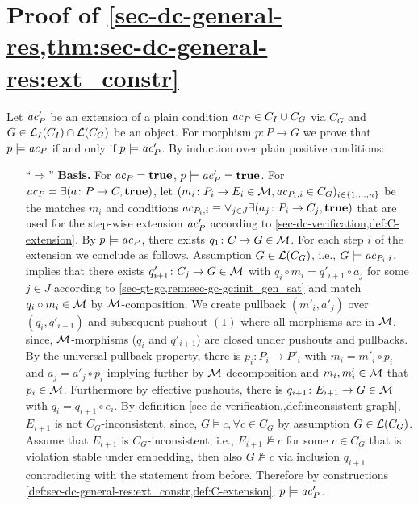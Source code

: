\section{Proof of \cref{sec-dc-general-res,thm:sec-dc-general-res:ext_constr}}
\label{sec-proofs:thm:sec-dc-general-res:ext_constr}
Let $\mathit{ac}'_P$ be an extension of a plain condition $\mathit{ac}_P \in C_I \cup C_G$ via $C_G$ and $G \in \mathcal{L}_I(C_I) \cap \mathcal{L}(C_G)$ be an object.
For morphism $p\colon P \to G$ we prove that $p \models \mathit{ac}_P$ if and only if $p \models \mathit{ac}'_P$.
By induction over plain positive conditions:
\begin{enumerate}
\item[``$\Rightarrow$''] \textbf{Basis.} For $\mathit{ac}_P=\textbf{true}$, $p \models \mathit{ac}'_P=\textbf{true}$.
For $\mathit{ac}_P=\exists(a\colon P \to C,\textbf{true})$, let $(m_i\colon P_i \to E_i \in {\cal M},\mathit{ac}_{P_i,i} \in C_G)_{i \in \{1,\ldots,n\}}$ be the matches $m_i$ and conditions $\mathit{ac}_{P_i,i} \equiv \vee_{j \in J}\exists(a_j\colon P_i \to C_j,\textbf{true})$ that are used for the step-wise extension $\mathit{ac}'_P$ according to \cref{sec-dc-verification,def:C-extension}.
By $p \models \mathit{ac}_P$, there exists $q_1\colon C \to G \in {\cal M}$.
For each step $i$ of the extension we conclude as follows.
Assumption $G \in \mathcal{L}(C_G)$, i.e., $G \models \mathit{ac}_{P_i,i}$, implies that there exists $q'_{i+1}\colon C_j \to G \in {\cal M}$ with $q_i \circ m_i=q'_{i+1} \circ a_j$ for some $j \in J$ according to \cref{sec-gt-gc,rem:sec-gc-gc:init_gen_sat} and match $q_i \circ m_i \in {\cal M}$ by ${\cal M}$-composition.
We create pullback $(m'_i,a'_j)$ over $(q_i,q'_{i+1})$ and subsequent pushout $(1)$ where all morphisms are in ${\cal M}$, since, ${\cal M}$-morphisms ($q_i$ and $q'_{i+1}$) are closed under pushouts and pullbacks.
By the universal pullback property, there is $p_i\colon P_i \to P'_i$ with $m_i=m'_i \circ p_i$ and $a_j=a'_j \circ p_i$ implying further by ${\cal M}$-decomposition and $m_i,m'_i \in {\cal M}$ that $p_i \in {\cal M}$.
Furthermore by effective pushouts, there is $q_{i+1}\colon E_{i+1} \to G \in {\cal M}$ with $q_i=q_{i+1} \circ e_i$.
By definition \cref{sec-dc-verification,,def:inconsistent-graph}, $E_{i+1}$ is not $C_G$-inconsistent, since, $G \models c,\forall c \in C_G$ by assumption $G \in \mathcal{L}(C_G)$.
Assume that $E_{i+1}$ is $C_G$-inconsistent, i.e., $E_{i+1} \not\models c$ for some $c \in C_G$ that is violation stable under embedding, then also $G \not\models c$ via inclusion $q_{i+1}$ contradicting with the statement from before.
Therefore by constructions \cref{def:sec-dc-general-res:ext_constr,def:C-extension}, $p \models \mathit{ac}'_P$.
\begin{center}

\end{center}
\end{enumerate}
